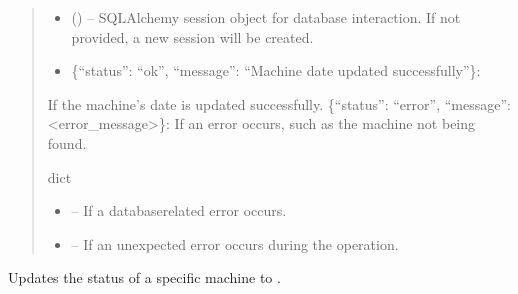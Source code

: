 \documentclass[letterpaper,10pt,english]{sphinxmanual}
\begin{document}
\begin{fulllineitems}
\begin{fulllineitems}
\begin{quote}
\begin{description}
\begin{itemize}
\item {} 
\sphinxAtStartPar
{} (\sphinxstyleliteralemphasis{\sphinxupquote{, }}) – SQLAlchemy session object for database interaction.
If not provided, a new session will be created.

\end{itemize}

\sphinxAtStartPar
\begin{description}
\begin{itemize}
\item {} 
\sphinxAtStartPar
\{“status”: “ok”, “message”: “Machine date updated successfully”\}:

\end{itemize}

\sphinxAtStartPar
If the machine’s date is updated successfully.
\sphinxhyphen{} \{“status”: “error”, “message”: <error\_message>\}:
If an error occurs, such as the machine not being found.

\end{description}


\sphinxAtStartPar
dict

\begin{itemize}
\item {} 
\sphinxAtStartPar
{} – If a database\sphinxhyphen{}related error occurs.

\item {} 
\sphinxAtStartPar
{} – If an unexpected error occurs during the operation.

\end{itemize}

\end{description}\end{quote}

\end{fulllineitems}


\begin{fulllineitems}
\label{\detokenize{app.controllers:app.controllers.machine_controller.MachineController.updateMachineStatus}}
\pysigstartsignatures
\pysiglinewithargsret
{}
{\sphinxparamcomma {}}
{}
\pysigstopsignatures
\sphinxAtStartPar
Updates the status of a specific machine to .


\end{fulllineitems}
\end{fulllineitems}
\end{document}
